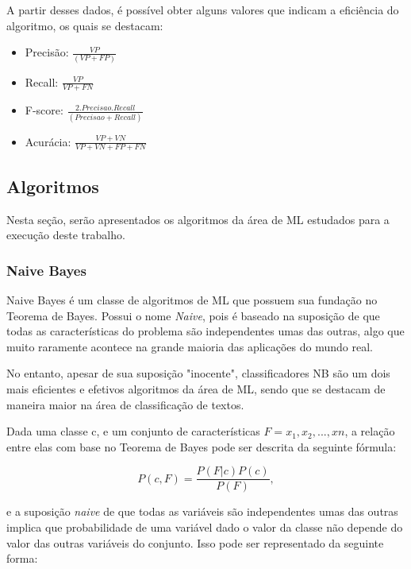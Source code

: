 A partir desses dados, é possível obter alguns valores que indicam a eficiência do algoritmo, os quais se destacam:

\begin{itemize}
    \item Precisão: $\frac{VP}{(VP + FP)}$
    \item Recall: $\frac{VP}{VP + FN}$
    \item F-score: $\frac{2 . Precisao . Recall}{(Precisao + Recall)}$
    \item Acurácia: $\frac{VP + VN}{VP + VN + FP + FN}$
    
\end{itemize}

\subsection{Algoritmos}

Nesta seção, serão apresentados os algoritmos da área de ML estudados para a execução deste trabalho.

\subsubsection{Naive Bayes}

Naive Bayes é um classe de algoritmos de ML que possuem sua fundação no Teorema de Bayes. Possui o nome \textit{Naive}, pois é baseado na suposição de que todas as características do problema são independentes umas das outras, algo que muito raramente acontece na grande maioria das aplicações do mundo real.

No entanto, apesar de sua suposição "inocente", classificadores NB são um dois mais eficientes e efetivos algoritmos da área de ML, sendo que se destacam de maneira maior na área de classificação de textos. \cite{zhang2004optimality}

Dada uma classe c, e um conjunto de características $F = x_{1},x_{2},...,xn$, a relação entre elas com base no Teorema de Bayes pode ser descrita da seguinte fórmula:

\begin{equation}
\label{e.bayes}
P(c,F)=\frac{P(F|c)P(c)}{P(F)},
\end{equation}

e a suposição \textit{naive} de que todas as variáveis são independentes umas das outras implica que probabilidade de uma variável dado o valor da classe não depende do valor das outras variáveis do conjunto. Isso pode ser representado da seguinte forma:

